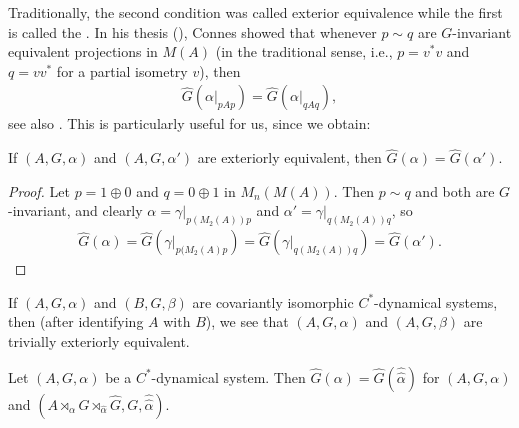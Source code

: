 Traditionally, the second condition was called exterior equivalence while the first is called the . In his thesis (\cite[2.2.5]{connesclassification}), Connes showed that whenever $p\sim q$ are $G$-invariant equivalent projections in $M(A)$ (in the traditional sense, i.e., $p = v^*v$ and $ q = v v^*$ for a partial isometry $v$), then
\begin{align*}
	\hat G (\alpha |_{pAp}) = \hat G (\alpha|_{qAq}),
\end{align*}
see also \cite[lemma 4.3]{olesenpedersen1}. This is particularly useful for us, since we obtain:
\begin{proposition}
	If $(A,G,\alpha)$ and $(A, G , \alpha')$ are exteriorly equivalent, then $\hat G(\alpha) = \hat G(\alpha')$.
\end{proposition}
\begin{proof}
	Let $p = 1 \oplus 0$ and $q = 0 \oplus 1$ in $M_n(M(A))$. Then $p \sim q$ and both are $G$-invariant, and clearly $\alpha = \gamma | _{p(M_2(A))p}$ and $\alpha' = \gamma|_{q (M_2(A))q}$, so
	\begin{align*}
		\hat G(\alpha) = \hat G ( \gamma|_{p(M_2(A)p}) = \hat G(\gamma|_{q(M_2(A))q}) = \hat G(\alpha').
	\end{align*}
\end{proof}
\begin{note}
	If $(A, G, \alpha)$ and $(B, G, \beta)$ are covariantly isomorphic $C^*$-dynamical systems, then (after identifying $A$ with $B$), we see that $(A,G, \alpha)$ and $(A, G, \beta)$ are trivially exteriorly equivalent.
\end{note}
\begin{theorem}
	Let $(A,G,\alpha)$ be a $C^*$-dynamical system. Then $\hat G(\alpha)=\hat G (\hat{\hat \alpha})$ for $(A, G, \alpha)$ and $(A \rtimes_\alpha G \rtimes_{\hat \alpha} \hat G, G, \hat{\hat \alpha})$.
	\label{dualactionspectrum}
\end{theorem}
